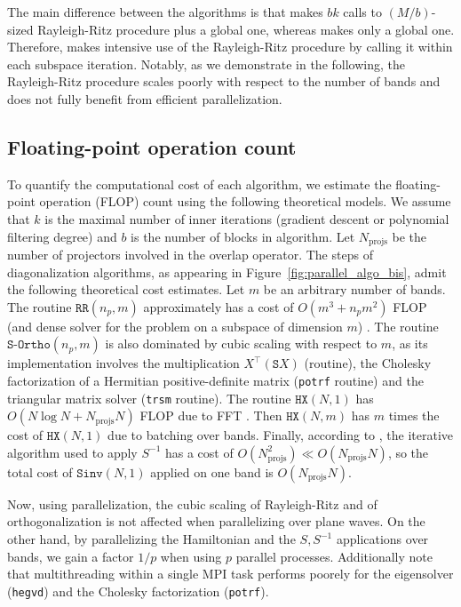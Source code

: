 \documentclass[twocolumn,superscriptaddress]{revtex4-1}
\begin{document}
The main difference between the algorithms is that \lobpcg{} makes $bk$ calls to $(M/b)$-sized Rayleigh-Ritz procedure plus a global one, whereas \chebyshevfiltering{} makes only a global one. Therefore, \lobpcg{} makes intensive use of the Rayleigh-Ritz procedure by calling it within each subspace iteration. Notably, as we demonstrate in the following, the Rayleigh-Ritz procedure scales poorly with respect to the number of bands and does not fully benefit from efficient parallelization.

\subsection{Floating-point operation count}\label{sec:flop_count}

To quantify the computational cost of each algorithm, we estimate the floating-point operation (FLOP) count using the following theoretical models. We assume that $k$ is the maximal number of inner iterations (gradient descent or polynomial filtering degree) and $b$ is the number of blocks in \lobpcg algorithm. Let $N_{\text{projs}}$ be the number of projectors involved in the overlap operator. The steps of diagonalization algorithms, as appearing in Figure~\ref{fig:parallel_algo_bis}, admit the following theoretical cost estimates. Let $m$ be an arbitrary number of bands. The routine $\texttt{RR}(n_p,m)$ approximately has a cost of $O(m^3+n_pm^2)$ FLOP (\gemm and \hegvd dense \lapack solver for the problem on a subspace of dimension $m$) \cite{doi:10.1137/070688778}. The routine $\texttt{S-Ortho}(n_p,m)$ is also dominated by cubic scaling with respect to $m$, as its implementation involves the multiplication $X^\top (\texttt{S}X)$ (\gemm routine), the Cholesky factorization of a Hermitian positive-definite matrix (\texttt{potrf} routine) and the triangular matrix solver (\texttt{trsm} routine). The routine $\texttt{HX}(N,1)$ has $O(N\log N+N_{\text{projs}}N)$ FLOP due to FFT \cite{LEVITT201598,d3ea2d52-5ab2-3128-8b80-efb85267295d}. Then $\texttt{HX}(N,m)$ has $m$ times the cost of $\texttt{HX}(N,1)$ due to batching over bands. Finally, according to \cite{LEVITT201598}, the iterative algorithm used to apply $S^{-1}$ has a cost of $O(N_{\text{projs}}^2)\ll O(N_{\text{projs}}N)$, so the total cost of $\texttt{Sinv}(N,1)$ applied on one band is $O(N_{\text{projs}}N)$.

Now, using parallelization, the cubic scaling of Rayleigh-Ritz and of orthogonalization is not affected when parallelizing over plane waves. On the other hand, by parallelizing the Hamiltonian and the $S,S^{-1}$ applications over bands, we gain a factor $1/p$ when using $p$ parallel processes. Additionally note that multithreading within a single MPI task performs poorely for the eigensolver (\texttt{hegvd}) and the Cholesky factorization (\texttt{potrf}).
\end{document}
